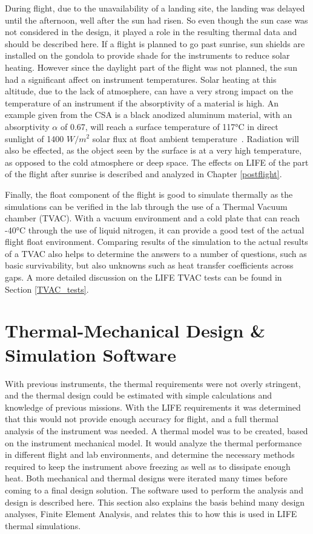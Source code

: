 During flight, due to the unavailability of a landing site, the landing was delayed until the afternoon, well after the sun had risen. So even though the sun case was not considered in the design, it played a role in the resulting thermal data and should be described here. If a flight is planned to go past sunrise, sun shields are installed on the gondola to provide shade for the instruments to reduce solar heating. However since the daylight part of the flight was not planned, the sun had a significant affect on instrument temperatures. Solar heating at this altitude, due to the lack of atmosphere, can have a very strong impact on the temperature of an instrument if the absorptivity of a material is high. An example given from the CSA is a black anodized aluminum material, with an absorptivity $\alpha$ of 0.67, will reach a surface temperature of 117°C in direct sunlight of 1400 $W/m^2$ solar flux at float ambient temperature~\citep{STRATOS_CARMENCITA_doc}. Radiation will also be effected, as the object seen by the surface is at a very high temperature, as opposed to the cold atmosphere or deep space. The effects on LIFE of the part of the flight after sunrise is described and analyzed in Chapter \ref{postflight}.

Finally, the float component of the flight is good to simulate thermally as the simulations can be verified in the lab through the use of a Thermal Vacuum chamber (TVAC). With a vacuum environment and a cold plate that can reach -40°C through the use of liquid nitrogen, it can provide a good test of the actual flight float environment. Comparing results of the simulation to the actual results of a TVAC also helps to determine the answers to a number of questions, such as basic survivability, but also unknowns such as heat transfer coefficients across gaps. A more detailed discussion on the LIFE TVAC tests can be found in Section \ref{TVAC_tests}.

\section{Thermal-Mechanical Design \& Simulation Software}\label{thermal_sim_sw_sec}
With previous instruments, the thermal requirements were not overly stringent, and the thermal design could be estimated with simple calculations and knowledge of previous missions. With the LIFE requirements it was determined that this would not provide enough accuracy for flight, and a full thermal analysis of the instrument was needed. A thermal model was to be created, based on the instrument mechanical model. It would analyze the thermal performance in different flight and lab environments, and determine the necessary methods required to keep the instrument above freezing as well as to dissipate enough heat. Both mechanical and thermal designs were iterated many times before coming to a final design solution. The software used to perform the analysis and design is described here. This section also explains the basis behind many design analyses, Finite Element Analysis, and relates this to how this is used in LIFE thermal simulations.

